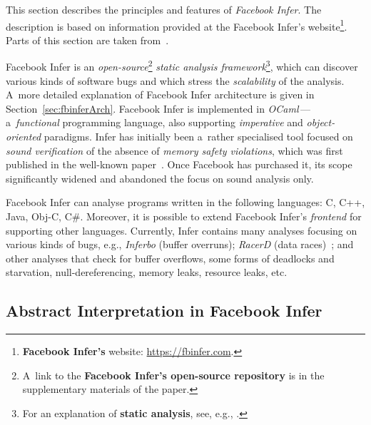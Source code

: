 \documentclass{ExcelAtFIT}
\theoremstyle{example}
\begin{document}
This section describes the principles and features of \emph{Facebook Infer}. The description is based on information provided at the Facebook Infer's website\footnote{\textbf{Facebook Infer's} website: \url{https://fbinfer.com}.}. Parts of this section are taken from~\cite{harmimBP}.

Facebook Infer is an \emph{open-source}\footnote{A~link to the \textbf{Facebook Infer's open-source repository} is in the supplementary materials of the paper.} \emph{static analysis framework}\footnote{For an explanation of \textbf{static analysis}, see, e.g., \cite{staticAnalysisMoller, programAnalysisNielson, staticAnalysisRival}.}, which can discover various kinds of software bugs and which stress the \emph{scalability} of the analysis. A~more detailed explanation of Facebook Infer architecture is given in Section~\ref{sec:fbinferArch}. Facebook Infer is implemented in \emph{OCaml}\,---\,a~\emph{functional} programming language, also supporting \emph{imperative} and \emph{object-oriented} paradigms. Infer has initially been a~rather specialised tool focused on \emph{sound verification} of the absence of \emph{memory safety violations}, which was first published in the well-known paper~\cite{inferBiabduction}. Once Facebook has purchased it, its scope significantly widened and abandoned the focus on sound analysis only.

Facebook Infer can analyse programs written in the following languages: C, C++, Java, Obj-C, C\#. Moreover, it is possible to extend Facebook Infer's \emph{frontend} for supporting other languages. Currently, Infer contains many analyses focusing on various kinds of bugs, e.g., \emph{Inferbo} (buffer overruns); \emph{RacerD} (data races)~\cite{racerD}; and other analyses that check for buffer overflows, some forms of deadlocks and starvation, null-dereferencing, memory leaks, resource leaks, etc.

\subsection{Abstract Interpretation in Facebook Infer}
\end{document}
